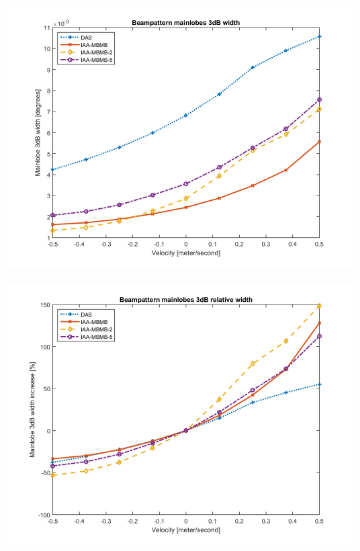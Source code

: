 \begin{figure}[ht]
    \centering
    \begin{subfigure}[t]{0.48\linewidth}
        \includegraphics[width=\linewidth]{./images/discussion/mainlobe_vs_speed.png}
    \end{subfigure}
    \quad
    \begin{subfigure}[t]{0.48\linewidth}
        \includegraphics[width=\linewidth]{./images/discussion/mainlobe_vs_speed_relative.png}
    \end{subfigure}
    \quad
    \begin{subfigure}[t]{0.48\linewidth}

\end{subfigure}
\end{figure}
